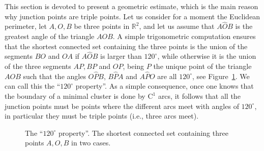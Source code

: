 \documentclass[11pt]{article}
\newcommand{\ie}{i.e.,\xspace}
\numberwithin{equation}{section}
\newcommand\R{\mathbb{R}}
\def\angle#1#2#3{#1\widehat{#2}#3}
\theoremstyle{plain}
\theoremstyle{definition}
\begin{document}
This section is devoted to present a geometric estimate, which is the main reason why junction points are triple points. Let us consider for a moment the Euclidean perimeter, let $A,O,B$ be three points in $\R^2$, and let us assume that $\angle AOB$ is the greatest angle of the triangle $AOB$. A simple trigonometric computation ensures that the shortest connected set containing the three points is the union of the segments $BO$ and $OA$ if $\angle AOB$ is larger than $120^\circ$, while otherwise it is the union of the three segments $AP, BP$ and $OP$, being $P$ the unique point of the triangle $AOB$ such that the angles $\angle OPB$, $\angle BPA$ and $\angle APO$ are all $120^\circ$, see Figure~\ref{Fig120}. We can call this the ``$120^\circ$ property''. As a simple consequence, once one knows that the boundary of a minimal cluster is done by $\mathrm{C}^1$ arcs, it follows that all the junction points must be points where the different arcs meet with angles of $120^\circ$, in particular they must be triple points (\ie three arcs meet).\par
\begin{figure}[htbp]
\caption{The ``$120^\circ$ property''. The shortest connected set containing three points $A, O,B$ in two cases.}\label{Fig120}
\end{figure}
\end{document}
